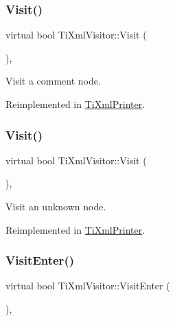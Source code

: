 \subsubsection{\texorpdfstring{Visit()}{Visit()}\hspace{0.1cm}{\footnotesize\ttfamily [3/4]}}
{\footnotesize\ttfamily virtual bool Ti\+Xml\+Visitor\+::\+Visit (\begin{DoxyParamCaption}\item[{const \hyperlink{class_ti_xml_comment}{Ti\+Xml\+Comment} \&}]{ }\end{DoxyParamCaption})\hspace{0.3cm}{\ttfamily [inline]}, {\ttfamily [virtual]}}



Visit a comment node. 



Reimplemented in \hyperlink{class_ti_xml_printer_a9870423f5603630e6142f6bdb66dfb57}{Ti\+Xml\+Printer}.

\mbox{\label{class_ti_xml_visitor_a7e284d607d275c51dac1adb58159ce28}} 
\subsubsection{\texorpdfstring{Visit()}{Visit()}\hspace{0.1cm}{\footnotesize\ttfamily [4/4]}}
{\footnotesize\ttfamily virtual bool Ti\+Xml\+Visitor\+::\+Visit (\begin{DoxyParamCaption}\item[{const \hyperlink{class_ti_xml_unknown}{Ti\+Xml\+Unknown} \&}]{ }\end{DoxyParamCaption})\hspace{0.3cm}{\ttfamily [inline]}, {\ttfamily [virtual]}}



Visit an unknown node. 



Reimplemented in \hyperlink{class_ti_xml_printer_a08591a15c9a07afa83c24e08b03d6358}{Ti\+Xml\+Printer}.

\mbox{\label{class_ti_xml_visitor_a07baecb52dd7d8716ae2a48ad0956ee0}} 
\subsubsection{\texorpdfstring{Visit\+Enter()}{VisitEnter()}\hspace{0.1cm}{\footnotesize\ttfamily [1/2]}}
{\footnotesize\ttfamily virtual bool Ti\+Xml\+Visitor\+::\+Visit\+Enter (\begin{DoxyParamCaption}\item[{const \hyperlink{class_ti_xml_document}{Ti\+Xml\+Document} \&}]{ }\end{DoxyParamCaption})\hspace{0.3cm}{\ttfamily [inline]}, {\ttfamily [virtual]}}



